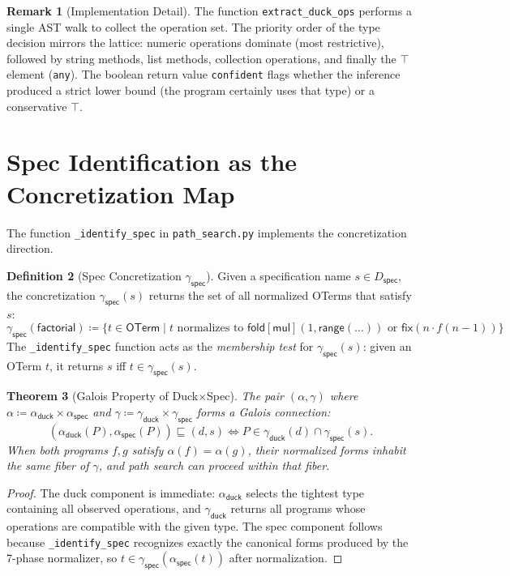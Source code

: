 \documentclass[11pt,a4paper]{report}
\theoremstyle{definition}
\newtheorem{definition}{Definition}[chapter]
\newtheorem{remark}[definition]{Remark}
\theoremstyle{plain}
\newtheorem{theorem}[definition]{Theorem}
\newcommand{\fold}{\mathsf{fold}}
\begin{document}
\begin{remark}[Implementation Detail]
The function \texttt{extract\_duck\_ops} performs a single AST walk
to collect the operation set.  The priority order of the type decision
mirrors the lattice: numeric operations dominate (most restrictive),
followed by string methods, list methods, collection operations, and
finally the $\top$ element (\texttt{any}).  The boolean return value
\texttt{confident} flags whether the inference produced a strict
lower bound (the program certainly uses that type) or a conservative
$\top$.
\end{remark}

\section{Spec Identification as the Concretization Map}

The function \texttt{\_identify\_spec} in \texttt{path\_search.py}
implements the concretization direction.

\begin{definition}[Spec Concretization $\gamma_\mathsf{spec}$]
\label{def:spec-concretization}
Given a specification name $s \in D_\mathsf{spec}$, the concretization
$\gamma_\mathsf{spec}(s)$ returns the set of all normalized OTerms
that satisfy $s$:
\[
  \gamma_\mathsf{spec}(\mathsf{factorial}) \coloneqq
    \{t \in \mathsf{OTerm} \mid t \text{ normalizes to }
    \fold[\mathsf{mul}](1, \mathsf{range}(\ldots))\text{ or }
    \mathsf{fix}(n \cdot f(n-1))\}
\]
The \texttt{\_identify\_spec} function acts as the \emph{membership
test} for $\gamma_\mathsf{spec}(s)$: given an OTerm $t$, it returns
$s$ iff $t \in \gamma_\mathsf{spec}(s)$.
\end{definition}

\begin{theorem}[Galois Property of Duck$\times$Spec]
\label{thm:galois-duck-spec}
The pair $(\alpha, \gamma)$ where
$\alpha \coloneqq \alpha_\mathsf{duck} \times \alpha_\mathsf{spec}$
and $\gamma \coloneqq \gamma_\mathsf{duck} \times \gamma_\mathsf{spec}$
forms a Galois connection:
\[
  (\alpha_\mathsf{duck}(P), \alpha_\mathsf{spec}(P)) \sqsubseteq (d, s)
  \iff P \in \gamma_\mathsf{duck}(d) \cap \gamma_\mathsf{spec}(s).
\]
When both programs $f, g$ satisfy $\alpha(f) = \alpha(g)$, their
normalized forms inhabit the same fiber of $\gamma$, and path search
can proceed within that fiber.
\end{theorem}

\begin{proof}
The duck component is immediate: $\alpha_\mathsf{duck}$ selects the
tightest type containing all observed operations, and
$\gamma_\mathsf{duck}$ returns all programs whose operations are
compatible with the given type.  The spec component follows because
\texttt{\_identify\_spec} recognizes exactly the canonical forms
produced by the 7-phase normalizer, so $t \in
\gamma_\mathsf{spec}(\alpha_\mathsf{spec}(t))$ after normalization.
\end{proof}
\end{document}
